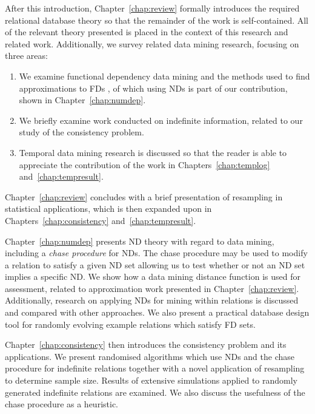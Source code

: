 After this introduction, Chapter~\ref{chap:review} formally introduces
the required relational database theory so that the remainder of the
work is self-contained.  All of the relevant theory presented is
placed in the context of this research and related work. Additionally,
we survey related data mining research, focusing on three areas:
\begin{enumerate}
\item
We examine functional dependency data mining and the methods used to
find approximations to FDs \cite{km95,at94,Mann92,sf93,HS95,pk95,bel95b,psm93}, of which using NDs is part of our
contribution, shown in Chapter~\ref{chap:numdep}.
\item We briefly
examine work conducted on 
indefinite information, related to our study of the consistency
problem.
\item Temporal data mining research is discussed so that
the reader is able to appreciate the contribution of the
work in Chapters~\ref{chap:templog}
and~\ref{chap:tempresult}. 
\end{enumerate}
Chapter~\ref{chap:review} concludes with a
brief presentation of
resampling in statistical applications, which is then expanded upon in
Chapters~\ref{chap:consistency} and~\ref{chap:tempresult}.

\medskip

Chapter~\ref{chap:numdep} presents ND theory with regard to data
mining, including a {\em chase procedure} for NDs. The chase
procedure may be used to modify a relation to satisfy a given ND set
allowing us 
to test whether or not an ND set implies a specific ND.
We show how a
data mining distance function is used for assessment, related
to approximation work presented in
Chapter~\ref{chap:review}. Additionally, research on applying NDs for
mining within relations is discussed and compared with other
approaches. We also present a practical database design tool for randomly
evolving example relations which satisfy FD sets.

\medskip
Chapter~\ref{chap:consistency} then introduces
the consistency problem and its applications. We present randomised
algorithms which use NDs and the chase procedure for indefinite
relations together with a novel application of resampling to determine
sample size. Results of extensive simulations applied to
randomly generated indefinite relations are examined. We
also discuss the 
usefulness of the chase procedure as a heuristic.

\medskip

